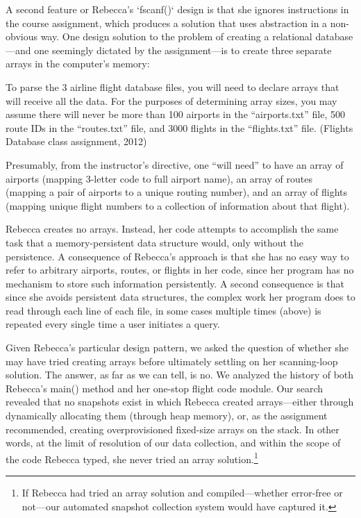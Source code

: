 A second feature or Rebecca's `fscanf()` design is that she ignores
instructions in the course assignment, which produces a solution that
uses abstraction in a non-obvious way. One design solution to the
problem of creating a relational database---and one seemingly dictated
by the assignment---is to create three separate arrays in the computer's
memory:

To parse the 3 airline ﬂight database ﬁles, you will need to declare
arrays that will receive all the data. For the purposes of determining
array sizes, you may assume there will never be more than 100 airports
in the ``airports.txt'' ﬁle, 500 route IDs in the ``routes.txt'' ﬁle,
and 3000 ﬂights in the ``ﬂights.txt'' ﬁle. (Flights Database class
assignment, 2012)

Presumably, from the instructor's directive, one ``will need'' to have
an array of airports (mapping 3-letter code to full airport name), an
array of routes (mapping a pair of airports to a unique routing number),
and an array of flights (mapping unique flight numbers to a collection
of information about that flight).

Rebecca creates no arrays. Instead, her code attempts to accomplish the
same task that a memory-persistent data structure would, only without
the persistence. A consequence of Rebecca's approach is that she has no
easy way to refer to arbitrary airports, routes, or flights in her code,
since her program has no mechanism to store such information
persistently. A second consequence is that since she avoids persistent
data structures, the complex work her program does to read through each
line of each file, in some cases multiple times (above) is repeated
every single time a user initiates a query.

Given Rebecca's particular design pattern, we asked the question of
whether she may have tried creating arrays before ultimately settling on
her scanning-loop solution. The answer, as far as we can tell, is no. We
analyzed the history of both Rebecca's main() method and her one-stop
flight code module. Our search revealed that no snapshots exist in which
Rebecca created arrays---either through dynamically allocating them
(through heap memory), or, as the assignment recommended, creating
overprovisioned fixed-size arrays on the stack. In other words, at the
limit of resolution of our data collection, and within the scope of the
code Rebecca typed, she never tried an array solution.\footnote{If
  Rebecca had tried an array solution and compiled---whether error-free
  or not---our automated snapshot collection system would have captured
  it.}

